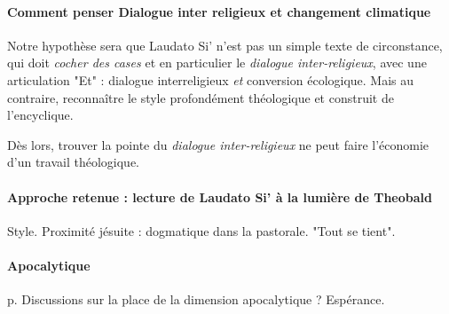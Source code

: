  


\paragraph{Comment penser Dialogue inter religieux et changement climatique} Notre hypothèse sera que Laudato Si’ n'est pas un simple texte de circonstance, qui doit \textit{cocher des cases} et en particulier le \textit{dialogue inter-religieux}, avec une articulation "Et" : dialogue interreligieux \textit{et} conversion écologique. Mais au contraire, reconnaître le style profondément théologique et construit de l'encyclique. 
 
Dès lors, trouver la pointe du \textit{dialogue inter-religieux} ne peut faire l'économie d'un travail théologique. 

\paragraph{Approche retenue : lecture de Laudato Si’ à la lumière de Theobald} Style. Proximité jésuite : dogmatique dans la pastorale. "Tout se tient". 


\paragraph{Apocalytique} p. \pageref{theob:apocalytique}
Discussions sur la place de la dimension apocalytique ? Espérance.


